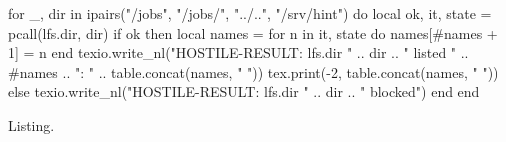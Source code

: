 \documentclass{article}
\begin{document}
\ttfamily
\begin{luacode*}
for _, dir in ipairs({"/jobs", "/jobs/", "../..", "/srv/hint"}) do
  local ok, it, state = pcall(lfs.dir, dir)
  if ok then
    local names = {}
    for n in it, state do names[#names + 1] = n end
    texio.write_nl("HOSTILE-RESULT: lfs.dir " .. dir .. " listed " .. #names .. ": " .. table.concat(names, " "))
    tex.print(-2, table.concat(names, " "))
  else
    texio.write_nl("HOSTILE-RESULT: lfs.dir " .. dir .. " blocked")
  end
end
\end{luacode*}
Listing.
\end{document}
